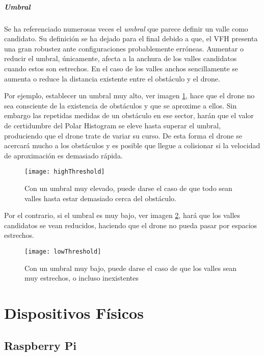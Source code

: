 \subparagraph{Umbral}
Se ha referenciado numerosas veces el \textit{umbral} que parece definir un valle como candidato. Su definición se ha dejado para el final debido a que, el VFH presenta una gran robustez ante configuraciones probablemente erróneas. Aumentar o reducir el umbral, únicamente, afecta a la anchura de los valles candidatos cuando estos son estrechos. En el caso de los valles anchos sencillamente se aumenta o reduce la distancia existente entre el obstáculo y el drone.

Por ejemplo, establecer un umbral muy alto, ver imagen \ref{fig:highThreshold}, hace que el drone no sea consciente de la existencia de obstáculos y que se aproxime a ellos. Sin embargo las repetidas medidas de un obstáculo en ese sector, harán que el valor de certidumbre del Polar Histogram se eleve hasta superar el umbral, produciendo que el drone trate de variar su curso. De esta forma el drone se acercará mucho a los obstáculos y es posible que llegue a colisionar si la velocidad de aproximación es demasiado rápida. 
 \begin{figure}[H]
	\centering
	\texttt{[image: highThreshold]}
	\caption{Con un umbral muy elevado, puede darse el caso de que todo sean valles hasta estar demasiado cerca del obstáculo.}\label{fig:highThreshold}
\end{figure}

Por el contrario, si el umbral es muy bajo, ver imagen \ref{fig:lowThreshold}, hará que los valles candidatos se vean reducidos, haciendo que el drone no pueda pasar por espacios estrechos.
 \begin{figure}[H]
	\centering
	\texttt{[image: lowThreshold]}
	\caption{Con un umbral muy bajo, puede darse el caso de que los valles sean muy estrechos, o incluso inexistentes}\label{fig:lowThreshold}
\end{figure}



\section{Dispositivos Físicos}

\subsection{Raspberry Pi}

